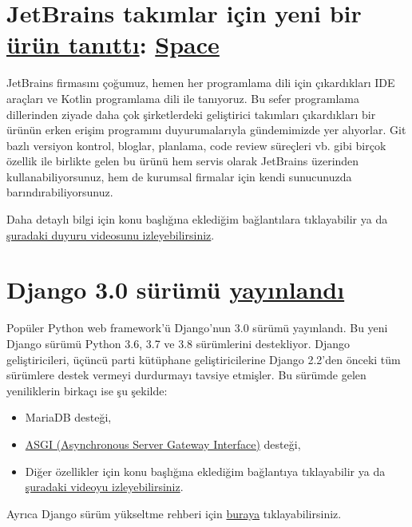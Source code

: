 \documentclass[11pt]{article}
\begin{document}
\section{JetBrains takımlar için yeni bir \href{https://blog.jetbrains.com/blog/2019/12/05/welcome-to-space/}{ürün tanıttı}: \href{https://www.jetbrains.com/space/}{Space}}
\label{sec:org30ef832}
JetBrains firmasını çoğumuz, hemen her programlama dili için çıkardıkları IDE
araçları ve Kotlin programlama dili ile tanıyoruz. Bu sefer programlama
dillerinden ziyade daha çok şirketlerdeki geliştirici takımları çıkardıkları
bir ürünün erken erişim programını duyurumalarıyla gündemimizde yer alıyorlar.
Git bazlı versiyon kontrol, bloglar, planlama, code review süreçleri vb. gibi
birçok özellik ile birlikte gelen bu ürünü hem servis olarak JetBrains
üzerinden kullanabiliyorsunuz, hem de kurumsal firmalar için kendi sunucunuzda
barındırabiliyorsunuz.

Daha detaylı bilgi için konu başlığına eklediğim bağlantılara tıklayabilir ya
da \href{https://www.youtube.com/watch?v=t1vMUV9jYRs}{şuradaki duyuru videosunu izleyebilirsiniz}.
\section{Django 3.0 sürümü \href{https://docs.djangoproject.com/en/3.0/releases/3.0/}{yayınlandı}}
\label{sec:org79b563a}
Popüler Python web framework'ü Django'nun 3.0 sürümü yayınlandı. Bu yeni Django
sürümü Python 3.6, 3.7 ve 3.8 sürümlerini destekliyor. Django geliştiricileri,
üçüncü parti kütüphane geliştiricilerine Django 2.2'den önceki tüm sürümlere
destek vermeyi durdurmayı tavsiye etmişler. Bu sürümde gelen yeniliklerin
birkaçı ise şu şekilde:
\begin{itemize}
\item MariaDB desteği,
\item \href{https://asgi.readthedocs.io/en/latest/}{ASGI (Asynchronous Server Gateway Interface)} desteği,
\item Diğer özellikler için konu başlığına eklediğim bağlantıya tıklayabilir ya
da \href{https://www.youtube.com/watch?v=\_BBNVFirvTY}{şuradaki videoyu izleyebilirsiniz}.
\end{itemize}

Ayrıca Django sürüm yükseltme rehberi için \href{https://docs.djangoproject.com/en/3.0/howto/upgrade-version/}{buraya} tıklayabilirsiniz.
\end{document}
